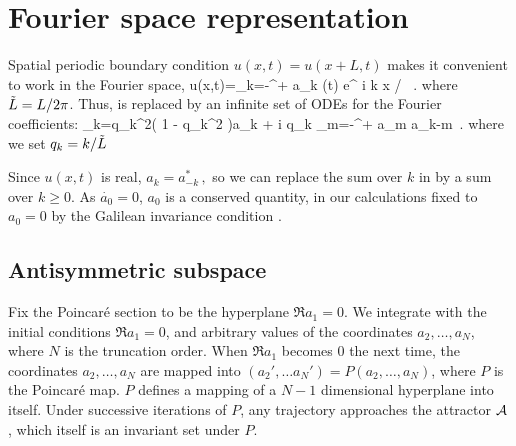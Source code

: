 \section{Fourier space representation} 
\label{s:FourierModes}



\noindent
Spatial periodic boundary condition $u(x,t)=u(x+L,t)$
makes it convenient to work in the Fourier space, 
\beq
  u(x,t)=\sum_{k=-\infty}^{+\infty} a_k (t) e^{ i k x / }
\, .
where $\tilde{L}=L/2\pi$. Thus,  is replaced by an infinite set of 
ODEs for the Fourier coefficients:
\beq
_k=q_k^2\left( 1 - q_k^2  \right)a_k 
 	 + i q_k \sum_{m=-\infty}^{+\infty} a_m a_{k-m}
\,.
where we set $q_k=k/\tilde{L}$

%


Since $u(x,t)$ is real,
$ %
a_k=a_{-k}^*
\,,
$ %
so we can replace the sum over $k$ in  by a
sum over $k \geq 0$.
As  $\dot{a_0}=0$, $a_0$ is a conserved quantity,
in our calculations
fixed to $a_0=0$ by
the Galilean invariance condition .


\subsection{Antisymmetric subspace} 
\label{s:AntisymmSubsp}

Fix the  Poincar\'e section to be the hyperplane
$\Re a_1=0$. We integrate  with the initial
 conditions
$\Re a_1=0$, and arbitrary values of the coordinates  $a_2, \ldots, a_N$, where
$N$ is the truncation order.  When $\Re a_1$ becomes
$0$ the next time,  the coordinates  $a_2, \ldots, a_N$ are mapped
into $(a_2', \ldots a_N')=P(a_2, \ldots, a_N)$, where $P$ is the  Poincar\'e
map. $P$ defines a mapping of a $N-1$ dimensional hyperplane into itself.
Under successive iterations of  $P$, any trajectory
approaches the attractor ${\cal A}$, which itself is an invariant
set under $P$.

